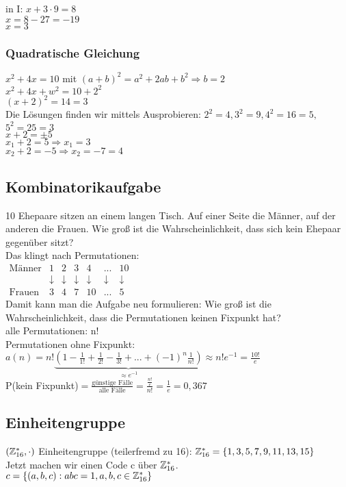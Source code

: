 in I: $x+3\cdot 9=8$\\
$x=8-27=-19$\\
$x=3$

\subsubsection{Quadratische Gleichung}
$x^2+4x=10$ mit $(a+b)^2 = a^2+2ab+b^2 \Rightarrow b=2$\\
$x^2+4x+w^2=10+2^2$\\
$(x+2)^2=14=3$\\
Die Lösungen finden wir mittels Ausprobieren: 
$2^2=4, 3^2=9, 4^2=16=5,$ \textbf{$5^2=25=3$}\\
$x+2=\pm 5$\\
$x_1 + 2 = 5 \Rightarrow x_1=3$\\
$x_2+2=-5 \Rightarrow x_2=-7=4$\\

\subsection{Kombinatorikaufgabe}
10 Ehepaare sitzen an einem langen Tisch. Auf einer Seite die Männer, auf der anderen die Frauen. Wie groß ist die Wahrscheinlichkeit, dass sich kein Ehepaar gegenüber sitzt? \\
Das klingt nach Permutationen: \\
$
\begin{array}{ccccccc}
\textrm{Männer} & 1 & 2 & 3 & 4 & ... & 10 \\ 
 & \downarrow & \downarrow & \downarrow & \downarrow & \downarrow & \downarrow \\ 
\textrm{Frauen} & 3 & 4 & 7 & 10 & ... & 5
\end{array} 
$\\
Damit kann man die Aufgabe neu formulieren: Wie groß ist die Wahrscheinlichkeit, dass die Permutationen keinen Fixpunkt hat?\\
alle Permutationen: n!\\
Permutationen ohne Fixpunkt: $a(n)=n!\underbrace{(1-\frac{1}{1!}+\frac{1}{2!}-\frac{1}{3!}+...+(-1)^n \frac{1}{n!})}_{\approx e^{-1}} \approx n! e^{-1}= \frac{10!}{e}$\\
P(kein Fixpunkt)$=\frac{\textrm{günstige Fälle}}{\textrm{alle Fälle}}=\frac{\frac{n!}{e}}{n!}=\frac{1}{e}=0,367$

\subsection{Einheitengruppe}
$(\mathbb{Z}_{16}^* ,\cdot)$ Einheitengruppe (teilerfremd zu 16): $\mathbb{Z}_{16}^*  = \{1,3,5,7,9,11,13,15\}$\\
Jetzt machen wir einen Code c über $\mathbb{Z}_{16}^* $.\\
$c=\{(a,b,c) : a b c = 1, a,b,c \in \mathbb{Z}_{16}^* \}$\\
